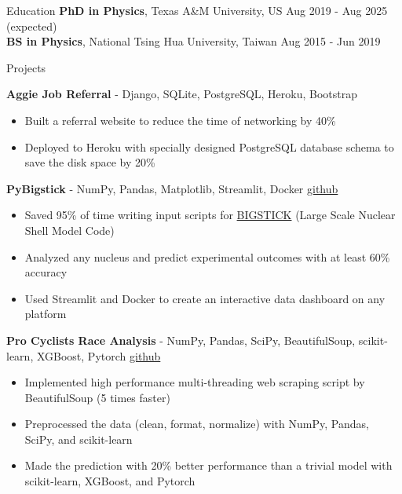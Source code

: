 \documentclass{resume}
\begin{document}
\vspace{-2.75em}
\begin{rSection}{Education}
{\bf PhD in Physics}, Texas A\&M University, US \hfill {Aug 2019 - Aug 2025 (expected)} \\
{\bf BS in Physics}, National Tsing Hua University, Taiwan \hfill {Aug 2015 - Jun 2019}
\vspace{-0.5em}


\begin{rSection}{Projects}
    \vspace{-1.25em}
    \item \textbf{Aggie Job Referral} - {Django, SQLite, PostgreSQL, Heroku, Bootstrap}
        \begin{itemize}
        \itemsep -3pt {}
        \item Built a referral website to reduce the time of networking by 40\%
        \item Deployed to Heroku with specially designed PostgreSQL database schema to save the disk space by 20\%
        \end{itemize}
    \item \textbf{PyBigstick} - {NumPy, Pandas, Matplotlib, Streamlit, Docker} \hfill {\href{https://github.com/noctildon/pyBigstick}{github}}
        \begin{itemize}
        \itemsep -3pt {}
        \item Saved 95\% of time writing input scripts for \href{https://github.com/cwjsdsu/BigstickPublick}{BIGSTICK} (Large Scale Nuclear Shell Model Code)
        \item Analyzed any nucleus and predict experimental outcomes with at least 60\% accuracy
        \item Used Streamlit and Docker to create an interactive data dashboard on any platform
        \end{itemize}
    \item \textbf{Pro Cyclists Race Analysis} - {NumPy, Pandas, SciPy, BeautifulSoup, scikit-learn, XGBoost, Pytorch} \hfill {\href{https://github.com/noctildon/pro_cyclists}{github}}
        \begin{itemize}
        \itemsep -3pt {}
        \item Implemented high performance multi-threading web scraping script by BeautifulSoup (5 times faster)
        \item Preprocessed the data (clean, format, normalize) with NumPy, Pandas, SciPy, and scikit-learn
        \item Made the prediction with 20\% better performance than a trivial model with scikit-learn, XGBoost, and Pytorch
        \end{itemize}
\end{rSection}




\end{rSection}
\end{document}
